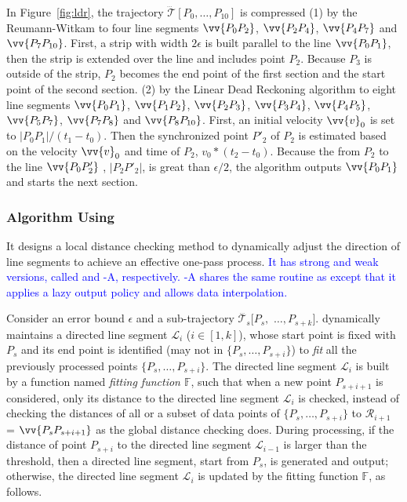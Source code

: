 {	\begin{example}
		\label{exm-alg-strip}
		In Figure~\ref{fig:ldr}, the trajectory $\dddot{\mathcal{T}}[P_0, \ldots, P_{10}]$ is compressed
		(1) by the Reumann-Witkam to four line segments $\vv{P_0P_2}$, $\vv{P_2P_4}$, $\vv{P_4P_7}$ and $\vv{P_7P_{10}}$. First, a strip with width $2\epsilon$ is built parallel to the line $\vv{P_0P_1}$, then the strip is extended over the line and includes point $P_2$. Because $P_3$ is outside of the strip, $P_2$ becomes the end point of the first section and the start point of the second section.
		(2) by the Linear Dead Reckoning algorithm to eight line segments $\vv{P_0P_1}$, $\vv{P_1P_2}$, $\vv{P_2P_3}$, $\vv{P_3P_4}$, $\vv{P_4P_5}$, $\vv{P_5P_7}$, $\vv{P_7P_8}$ and $\vv{P_8P_{10}}$. First, an initial velocity ${\vv{v}_0}$ is set to $|P_0P_1|/(t_1-t_0)$. Then the synchronized point $P'_2$ of $P_2$ is estimated based on the velocity ${\vv{v}_0}$ and time of $P_2$, \ie ${v}_0 * (t_2-t_0)$. Because the \sed from $P_2$ to the line $\vv{P_0P'_2}$ , \ie $|P_2P'_2|$, is great than $\epsilon/2$, the algorithm outputs $\vv{P_0P_1}$ and starts the next section.
	\end{example}
	
}%


\subsubsection{{Algorithm \operb Using \ped} \cite{Lin:Operb}}
It designs a local distance checking method to dynamically adjust the direction of line segments to achieve an effective one-pass process. \textcolor{blue}{It has strong and weak versions, called \operb and \operb-A, respectively. \operb-A shares the same routine as \operb except that it applies a lazy output policy and allows data interpolation.}

Consider an error bound $\epsilon$ and a sub-trajectory $\dddot{\mathcal{T}_s}[P_s,$ $\ldots, P_{s+k}]$.
\operb dynamically maintains a directed line segment $\mathcal{L}_i$ ($i\in[1,k]$), whose start point is fixed with $P_s$ and its end point is identified (may not in $\{P_s, \ldots, P_{s+i}\}$) to {\em fit} all the previously processed points $\{P_s, \ldots, P_{s+i}\}$.
The directed line segment $\mathcal{L}_i$ is built by a function named \emph{fitting function $\mathbb{F}$}, such that when a new point $P_{s+i+1}$ is considered, only its distance to the directed line segment $\mathcal{L}_i$ is checked, instead of checking the distances of all or a subset of data points of $\{P_{s}, \ldots, P_{s+i}\}$ to $\mathcal{R}_{i+1}$ = $\vv{P_sP_{s+i+1}}$ as the global distance checking does.
During processing, if the distance of point $P_{s+i}$ to the directed line segment $\mathcal{L}_{i-1}$ is larger than the threshold, then a directed line segment, start from $P_s$, is generated and output;
otherwise, the directed line segment $\mathcal{L}_i$ is updated by the fitting function $\mathbb{F}$, as follows.

